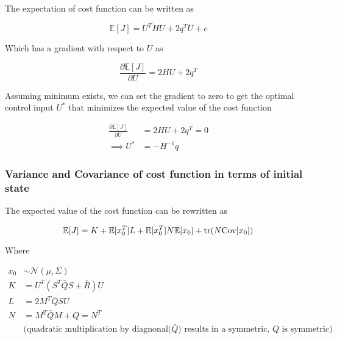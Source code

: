 \documentclass{article}
\begin{document}
The expectation of cost function can be written as

$$
\mathbb{E}[J] = U^T H U + 2 q^T U + c
$$

Which has a gradient with respect to $U$ as

$$
\frac{\partial \mathbb{E}[J]}{\partial U} = 2 H U + 2 q^T
$$

Assuming minimum exists, we can set the gradient to zero to get the optimal control input $U^*$ that minimizes the expected value of the cost function

\begin{equation}
  \begin{aligned}
    \frac{\partial \mathbb{E}[J]}{\partial U} &= 2 H U + 2 q^T = 0 \\
    \implies U^* &= -H^{-1} q
  \end{aligned}
\end{equation}

\subsubsection{Variance and Covariance of cost function in terms of initial state}


The expected value of the cost function can be rewritten as

$$
\mathbb{E}[J] = K + \mathbb{E}[x_0^T] L + \mathbb{E}[x_0^T] N \mathbb{E}[x_0] + \text{tr}(N \text{Cov}[x_0]) \\
$$

Where

$$
\begin{aligned}
  x_0 &\sim \mathcal{N}(\mu, \Sigma) \\
  K &= U^T(S^T \bar{Q} S + \bar{R}) U \\
  L &= 2 M^T \bar{Q} S U \\
  N &= M^T \bar{Q} M + Q = N^T \\
  &\text{(quadratic multiplication by diagnonal($\bar{Q}$) results in a symmetric, $Q$ is symmetric)} \\
\end{aligned}
$$
\end{document}
